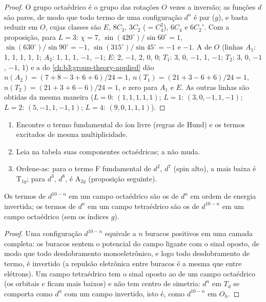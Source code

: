 \begin{proof}
O grupo octaédrico é o grupo das rotações $O$ vezes a inversão; as funções $d$ são
pares, de modo que todo termo de uma configuração $d^n$ é par ($g$), e basta reduzir
em $O$, cujas classes são $E$, $8C_3$, $3C_2$ ($=C_4^2$), $6C_4$ e $6C_2'$. Com a
proposição, para $L = 3$: $\chi = 7$, $\sin(420^\circ)/\sin60^\circ = 1$, $\sin(630^\circ)/\sin90^\circ = -1$, $\sin(315^\circ)/\sin45^\circ = -1$
e $-1$. A  de $O$ (linhas $A_1$: 1, 1, 1, 1, 1; $A_2$: 1, 1, 1, $-1$, $-1$; $E$: 2,
$-1$, 2, 0, 0; $T_1$: 3, 0, $-1$, 1, $-1$; $T_2$: 3, 0, $-1$, $-1$, 1) e a  do
\cref{ch:b3:group-theory-applied} dão $n(A_2) = (7 + 8 - 3 + 6 + 6)/24 = 1$, $n(T_1) = (21 + 3 - 6 +
6)/24 = 1$, $n(T_2) = (21 + 3 + 6 - 6)/24 = 1$, e zero para $A_1$ e $E$. As outras linhas são
obtidas da mesma maneira ($L = 0$: $(1, 1, 1, 1, 1)$; $L = 1$: $(3, 0, -1, 1, -1)$; $L = 2$: $(5, -1, 1,
-1, 1)$; $L = 4$: $(9, 0, 1, 1, 1)$).
\end{proof}

\begin{method}\label{met:b3:complex-spectra-magnetism:split-term}
\begin{enumerate}
  \item Encontre o termo fundamental do íon livre (regras de Hund) e os termos
        excitados de mesma multiplicidade.
  \item Leia na tabela suas componentes octaédricas; a  não
        muda.
  \item Ordene-as: para o termo F fundamental de $d^2$, $d^7$ (spin alto), a mais baixa é T$_{1g}$;
        para $d^3$, $d^8$, é A$_{2g}$ (proposição seguinte).
\end{enumerate}
\end{method}

\begin{proposition}\label{prop:b3:complex-spectra-magnetism:hole}
Os termos de $d^{10-n}$ em um campo octaédrico são os de $d^n$ em ordem de energia
invertida; os termos de $d^n$ em um campo tetraédrico são os de $d^{10-n}$ em um campo
octaédrico (sem os índices $g$).
\end{proposition}

\begin{proof}
Uma configuração $d^{10-n}$ equivale a $n$ buracos positivos em uma camada completa: os
buracos sentem o potencial do campo ligante com o sinal oposto, de modo que todo
desdobramento monoeletrônico, e logo todo desdobramento de termo, é invertido (a
repulsão eletrônica entre buracos é a mesma que entre elétrons). Um campo
tetraédrico tem o sinal oposto ao de um campo octaédrico (os orbitais $e$ ficam
mais baixos) e não tem centro de simetria: $d^n$ em $T_d$ se comporta como $d^n$ com um
campo invertido, isto é, como $d^{10-n}$ em $O_h$.
\end{proof}

